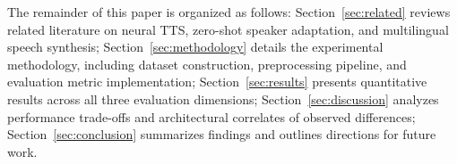 The remainder of this paper is organized as follows: Section~\ref{sec:related} reviews related literature on neural TTS, zero-shot
speaker adaptation, and multilingual speech synthesis; Section~\ref{sec:methodology} details the experimental methodology,
including dataset construction, preprocessing pipeline, and evaluation metric implementation; Section~\ref{sec:results} presents
quantitative results across all three evaluation dimensions; Section~\ref{sec:discussion} analyzes performance trade-offs and
architectural correlates of observed differences; Section~\ref{sec:conclusion} summarizes findings and outlines directions for
future work.
